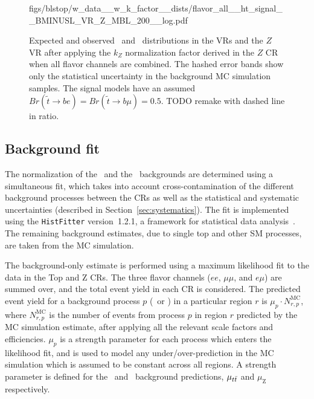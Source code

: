 \begin{figure}
{      {figs/blstop/w_data__w_k_factor__dists/flavor_all__ht_signal__BMINUSL_VR_Z_MBL_200__log.pdf}
  }
  \caption{
    Expected and observed \MBL\ and \HT\ distributions in the
    VRs and the $Z$ VR after applying the $k_Z$ normalization factor derived
    in the $Z$ CR when all flavor channels are combined.
    The hashed error bands show only the statistical uncertainty in the
    background MC simulation samples.
    The signal models have an assumed
    $Br(\tilde{t}\rightarrow be) = Br(\tilde{t}\rightarrow b\mu) = 0.5$.
    {\color{red} TODO remake with dashed line in ratio.}
  }
  \label{fig:vr_dists_w_norm_factor}
\end{figure}





\FloatBarrier
\subsection{Background fit}
\label{sec:bkg_fit}

The normalization of the \TTBAR\ and the \ZGAMMAJETS\ backgrounds are
determined using a simultaneous fit, which takes into account
cross-contamination of the different background processes between the
CRs as well as the statistical and systematic uncertainties (described in
Section~\ref{sec:systematics}).
The fit is implemented using the \texttt{HistFitter} version~1.2.1, a framework
for statistical data analysis~\cite{Baak:2014wma}.
The remaining background estimates, due to  single top and other SM processes,
are taken from the MC simulation.

The background-only estimate is performed using a maximum likelihood fit
to the data in the Top and Z CRs.
The three flavor channels ($ee$, $\mu\mu$, and $e\mu$) are summed over, and the
total event yield in each CR is considered.
The predicted event yield for a background process $p$ (\TTBAR\ or \ZGAMMAJETS)
in a particular region $r$ is $\mu_{p} \cdot N_{r,p}^\mathrm{MC}$, where
$N_{r,p}^\mathrm{MC}$ is the number of events from process $p$ in region $r$
predicted by the MC simulation estimate, after applying all the relevant
scale factors and efficiencies.
$\mu_{p}$ is a strength parameter for each process which enters the likelihood
fit, and is used to model any under/over-prediction in the MC simulation
which is assumed to be constant across all regions.
A strength parameter is defined for the \TTBAR\ and \ZGAMMAJETS\ background
predictions, $\mu_{t\bar{t}}$ and $\mu_\mathrm{Z}$ respectively.

